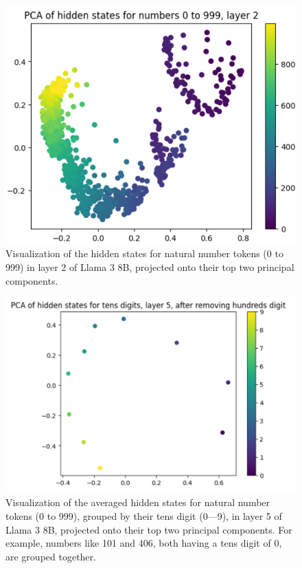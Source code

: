 \documentclass[11pt]{article}
\begin{document}
\begin{figure}[ht]
   \includegraphics[width=\columnwidth]{pca_all.png}
  \caption{Visualization of the hidden states for natural number tokens (0 to 999) in layer 2 of Llama 3 8B, projected onto their top two principal components.}
    \label{fig:pca_all}
\end{figure}

\begin{figure}[ht]

   \includegraphics[width=\columnwidth]{tens_digit_pca.png}
  \caption{Visualization of the averaged hidden states for natural number tokens (0 to 999), grouped by their tens digit (0—9), in layer 5 of Llama 3 8B, projected onto their top two principal components. For example, numbers like 101 and 406, both having a tens digit of 0, are grouped together.}
      \label{fig:pca_tens_digit}
\end{figure}
\end{document}
